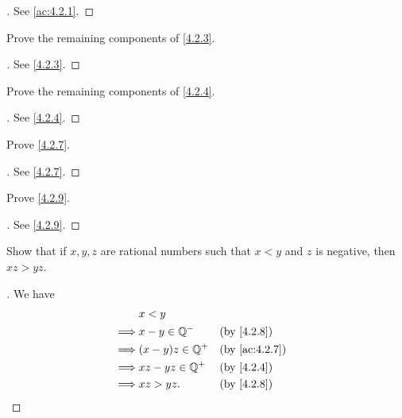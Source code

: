 \begin{proof}[]
  See \cref{ac:4.2.1}.
\end{proof}

\begin{ex}\label{ex:4.2.2}
  Prove the remaining components of \cref{4.2.3}.
\end{ex}

\begin{proof}[]
  See \cref{4.2.3}.
\end{proof}

\begin{ex}\label{ex:4.2.3}
  Prove the remaining components of \cref{4.2.4}.
\end{ex}

\begin{proof}[]
  See \cref{4.2.4}.
\end{proof}

\begin{ex}\label{ex:4.2.4}
  Prove \cref{4.2.7}.
\end{ex}

\begin{proof}[]
  See \cref{4.2.7}.
\end{proof}

\begin{ex}\label{ex:4.2.5}
  Prove \cref{4.2.9}.
\end{ex}

\begin{proof}[]
  See \cref{4.2.9}.
\end{proof}

\begin{ex}\label{ex:4.2.6}
  Show that if \(x, y, z\) are rational numbers such that \(x < y\) and \(z\) is negative, then \(xz > yz\).
\end{ex}

\begin{proof}[]
  We have
  \begin{align*}
             & x < y                                \\
    \implies & x - y \in \Q^-    &  & \by{4.2.8}    \\
    \implies & (x - y)z \in \Q^+ &  & \by{ac:4.2.7} \\
    \implies & xz - yz \in \Q^+  &  & \by{4.2.4}    \\
    \implies & xz > yz.          &  & \by{4.2.8}
  \end{align*}
\end{proof}
